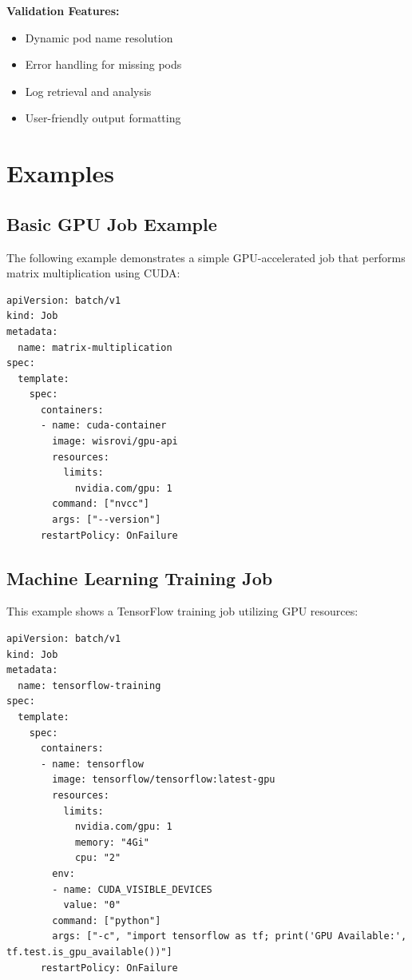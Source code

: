 \documentclass[12pt,a4paper]{report}
\begin{document}
\textbf{Validation Features:}
\begin{itemize}
    \item Dynamic pod name resolution
    \item Error handling for missing pods
    \item Log retrieval and analysis
    \item User-friendly output formatting
\end{itemize}

\chapter{Examples}
\label{chap:examples}

\section{Basic GPU Job Example}
The following example demonstrates a simple GPU-accelerated job that performs matrix multiplication using CUDA:

\begin{lstlisting}[caption=Matrix Multiplication GPU Job,label=lst:matrix-job]
apiVersion: batch/v1
kind: Job
metadata:
  name: matrix-multiplication
spec:
  template:
    spec:
      containers:
      - name: cuda-container
        image: wisrovi/gpu-api
        resources:
          limits:
            nvidia.com/gpu: 1
        command: ["nvcc"]
        args: ["--version"]
      restartPolicy: OnFailure
\end{lstlisting}

\section{Machine Learning Training Job}
This example shows a TensorFlow training job utilizing GPU resources:

\begin{lstlisting}[caption=TensorFlow Training Job,label=lst:tf-training]
apiVersion: batch/v1
kind: Job
metadata:
  name: tensorflow-training
spec:
  template:
    spec:
      containers:
      - name: tensorflow
        image: tensorflow/tensorflow:latest-gpu
        resources:
          limits:
            nvidia.com/gpu: 1
            memory: "4Gi"
            cpu: "2"
        env:
        - name: CUDA_VISIBLE_DEVICES
          value: "0"
        command: ["python"]
        args: ["-c", "import tensorflow as tf; print('GPU Available:', tf.test.is_gpu_available())"]
      restartPolicy: OnFailure
\end{lstlisting}
\end{document}
